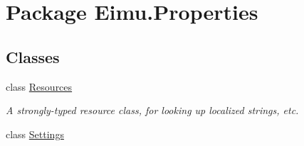 \hypertarget{namespace_eimu_1_1_properties}{
\section{Package Eimu.Properties}
\label{namespace_eimu_1_1_properties}
}
\subsection*{Classes}
\begin{DoxyCompactItemize}
\item 
class \hyperlink{class_eimu_1_1_properties_1_1_resources}{Resources}
\begin{DoxyCompactList}\small\item\em A strongly-\/typed resource class, for looking up localized strings, etc. \item\end{DoxyCompactList}\item 
class \hyperlink{class_eimu_1_1_properties_1_1_settings}{Settings}
\end{DoxyCompactItemize}
